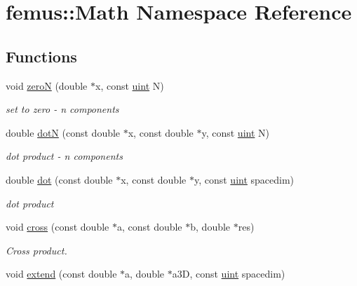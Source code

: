 \hypertarget{namespacefemus_1_1_math}{}\section{femus\+:\+:Math Namespace Reference}
\label{namespacefemus_1_1_math}
\subsection*{Functions}
\begin{DoxyCompactItemize}
\item 
void \mbox{\hyperlink{namespacefemus_1_1_math_a1ac507af12e3ceaf078b640984b82059}{zeroN}} (double $\ast$x, const \mbox{\hyperlink{_typedefs_8hpp_a91ad9478d81a7aaf2593e8d9c3d06a14}{uint}} N)
\begin{DoxyCompactList}\small\item\em set to zero -\/ n components \end{DoxyCompactList}\item 
double \mbox{\hyperlink{namespacefemus_1_1_math_af3228f411dbbd6dd3a4ece9f5641b462}{dotN}} (const double $\ast$x, const double $\ast$y, const \mbox{\hyperlink{_typedefs_8hpp_a91ad9478d81a7aaf2593e8d9c3d06a14}{uint}} N)
\begin{DoxyCompactList}\small\item\em dot product -\/ n components \end{DoxyCompactList}\item 
double \mbox{\hyperlink{namespacefemus_1_1_math_a804b6e7af3d40fe1c09928089b7dfccb}{dot}} (const double $\ast$x, const double $\ast$y, const \mbox{\hyperlink{_typedefs_8hpp_a91ad9478d81a7aaf2593e8d9c3d06a14}{uint}} spacedim)
\begin{DoxyCompactList}\small\item\em dot product \end{DoxyCompactList}\item 
void \mbox{\hyperlink{namespacefemus_1_1_math_a06daa97a94cd109a7d0229d4e23a40d6}{cross}} (const double $\ast$a, const double $\ast$b, double $\ast$res)
\begin{DoxyCompactList}\small\item\em Cross product. \end{DoxyCompactList}\item 
void \mbox{\hyperlink{namespacefemus_1_1_math_a7c61609663b61259ec67232f7eba0d3c}{extend}} (const double $\ast$a, double $\ast$a3D, const \mbox{\hyperlink{_typedefs_8hpp_a91ad9478d81a7aaf2593e8d9c3d06a14}{uint}} spacedim)

\end{DoxyCompactItemize}
